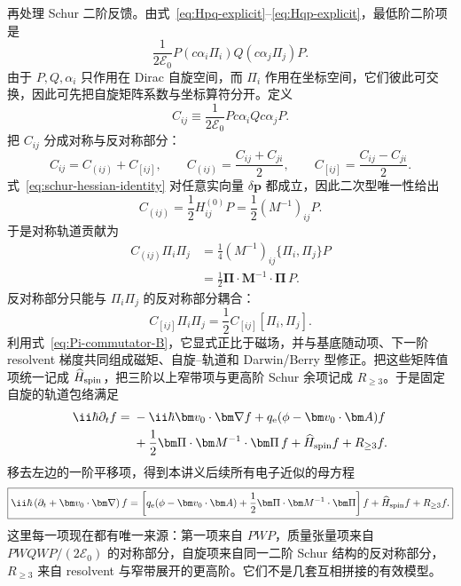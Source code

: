 再处理 Schur 二阶反馈。由式~\eqref{eq:Hpq-explicit}--\eqref{eq:Hqp-explicit}，最低阶二阶项是
\begin{equation}
\frac{1}{2\mathcal E_0}
P(c\alpha_i\Pi_i)Q(c\alpha_j\Pi_j)P.
\label{eq:schur-second-operator-start}
\end{equation}
由于 $P,Q,\alpha_i$ 只作用在 Dirac 自旋空间，而 $\Pi_i$ 作用在坐标空间，它们彼此可交换，因此可先把自旋矩阵系数与坐标算符分开。定义
\begin{equation}
C_{ij}\equiv
\frac{1}{2\mathcal E_0}Pc\alpha_iQc\alpha_jP.
\end{equation}
把 $C_{ij}$ 分成对称与反对称部分：
\begin{equation}
C_{ij}=C_{(ij)}+C_{[ij]},
\qquad
C_{(ij)}=\frac{C_{ij}+C_{ji}}{2},
\qquad
C_{[ij]}=\frac{C_{ij}-C_{ji}}{2}.
\end{equation}
式~\eqref{eq:schur-hessian-identity} 对任意实向量 $\delta\bm p$ 都成立，因此二次型唯一性给出
\begin{equation}
\boxed{
C_{(ij)}=\frac12H_{ij}^{(0)}P
=\frac12(M^{-1})_{ij}P.}
\label{eq:Cij-symmetric-mass}
\end{equation}
于是对称轨道贡献为
\begin{align}
C_{(ij)}\Pi_i\Pi_j
&=\frac14(M^{-1})_{ij}\{\Pi_i,\Pi_j\}P\\
&=\frac12\bm\Pi\cdot\bm M^{-1}\cdot\bm\Pi\,P.
\label{eq:schur-orbital-operator}
\end{align}
反对称部分只能与 $\Pi_i\Pi_j$ 的反对称部分耦合：
\begin{equation}
C_{[ij]}\Pi_i\Pi_j
=\frac12C_{[ij]}[\Pi_i,\Pi_j].
\end{equation}
利用式~\eqref{eq:Pi-commutator-B}，它显式正比于磁场，并与基底随动项、下一阶 resolvent 梯度共同组成磁矩、自旋--轨道和 Darwin/Berry 型修正。把这些矩阵值项统一记成 $\widehat H_{\rm spin}$，把三阶以上窄带项与更高阶 Schur 余项记成 $R_{\ge3}$。于是固定自旋的轨道包络满足
\begin{align}
\ii\hbar\partial_t f
={}&-\ii\hbar\bm v_0\cdot\bm\nabla f
+q_{\rm e}(\phi-\bm v_0\cdot\bm A)f\\
&+\frac12\bm\Pi\cdot\bm M^{-1}\cdot\bm\Pi\,f
+\widehat H_{\rm spin}f+R_{\ge3}f.
\end{align}
移去左边的一阶平移项，得到本讲义后续所有电子近似的母方程
\begin{equation}
\boxed{
\ii\hbar\left(\partial_t+\bm v_0\cdot\bm\nabla\right)f
=\left[
q_{\rm e}(\phi-\bm v_0\cdot\bm A)
+\frac12\bm\Pi\cdot\bm M^{-1}\cdot\bm\Pi
\right]f
+\widehat H_{\rm spin}f+R_{\ge3}f.}
\label{eq:rel-envelope-tensor}
\end{equation}
这里每一项现在都有唯一来源：第一项来自 $PWP$，质量张量项来自 $PWQWP/(2\mathcal E_0)$ 的对称部分，自旋项来自同一二阶 Schur 结构的反对称部分，$R_{\ge3}$ 来自 resolvent 与窄带展开的更高阶。它们不是几套互相拼接的有效模型。

